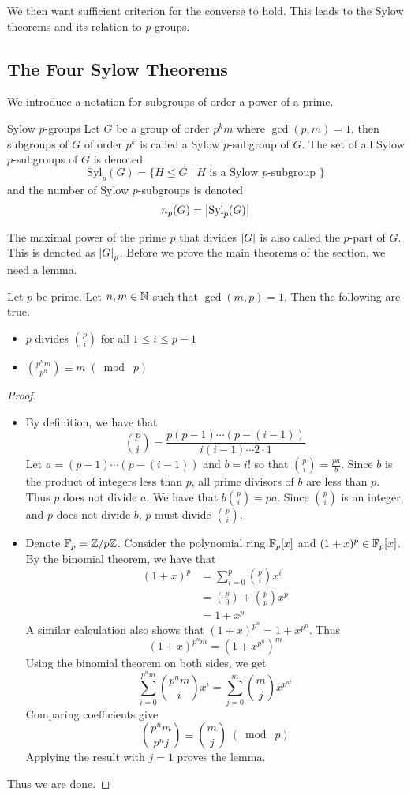 \documentclass[a4paper]{article}
\begin{document}
We then want sufficient criterion for the converse to hold. This leads to the Sylow theorems and its relation to $p$-groups. 
\subsection{The Four Sylow Theorems}
We introduce a notation for subgroups of order a power of a prime. 

\begin{defn}{Sylow $p$-groups}{} Let $G$ be a group of order $p^km$ where $\gcd(p,m)=1$, then subgroups of $G$ of order $p^k$ is called a Sylow $p$-subgroup of $G$. The set of all Sylow $p$-subgroups of $G$ is denoted $$\text{Syl}_p(G)=\{H\leq G\;|\;H\text{ is a Sylow }p\text{-subgroup }\}$$ and the number of Sylow $p$-subgroups is denoted $$n_p(G)=\abs{\text{Syl}_p(G)}$$ 
\end{defn}

The maximal power of the prime $p$ that divides $\abs{G}$ is also called the $p$-part of $G$. This is denoted as $\abs{G}_p$. Before we prove the main theorems of the section, we need a lemma. 

\begin{lmm}{}{} Let $p$ be prime. Let $n,m\in\mathbb{N}$ such that $\gcd(m,p)=1$. Then the following are true. 
\begin{itemize}
\item $p$ divides $\binom{p}{i}$ for all $1\leq i\leq p-1$
\item $\binom{p^nm}{p^n}\equiv m\;(\bmod\;p)$
\end{itemize} \tcbline
\begin{proof}~\\
\begin{itemize}
\item By definition, we have that $$\binom{p}{i}=\frac{p(p-1)\cdots(p-(i-1))}{i(i-1)\cdots2\cdot 1}$$ Let $a=(p-1)\cdots(p-(i-1))$ and $b=i!$ so that $\binom{p}{i}=\frac{pa}{b}$. Since $b$ is the product of integers less than $p$, all prime divisors of $b$ are less than $p$. Thus $p$ does not divide $a$. We have that $b\binom{p}{i}=pa$. Since $\binom{p}{i}$ is an integer, and $p$ does not divide $b$, $p$ must divide $\binom{p}{i}$. 
\item Denote $\mathbb{F}_p=\mathbb{Z}/p\mathbb{Z}$. Consider the polynomial ring $\mathbb{F}_p[x]$ and $(1+x)^p\in\mathbb{F}_p[x]$. By the binomial theorem, we have that 
\begin{align*}
(1+x)^p&=\sum_{i=0}^p\binom{p}{i}x^i\\
&=\binom{p}{0}+\binom{p}{p}x^p\\
&=1+x^p
\end{align*}
A similar calculation also shows that $(1+x)^{p^n}=1+x^{p^n}$. Thus $$(1+x)^{p^nm}=(1+x^{p^n})^m$$ Using the binomial theorem on both sides, we get $$\sum_{i=0}^{p^nm}\binom{p^nm}{i}x^i=\sum_{j=0}^m\binom{m}{j}x^{p^{n^j}}$$ Comparing coefficients give $$\binom{p^nm}{p^nj}\equiv\binom{m}{j}\;(\bmod\;p)$$ Applying the result with $j=1$ proves the lemma. 
\end{itemize}
Thus we are done. 
\end{proof}
\end{lmm}
\end{document}
